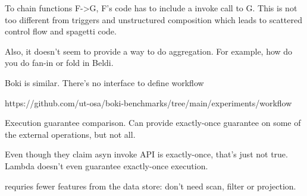 To chain functions F->G, F's code has to include a invoke call to G. This is
not too different from triggers and unstructured composition which leads to
scattered control flow and spagetti code.

Also, it doesn't seem to provide a way to do aggregation. For example, how do
you do fan-in or fold in Beldi.

Boki is similar. There's no interface to define workflow

https://github.com/ut-osa/boki-benchmarks/tree/main/experiments/workflow

Execution guarantee comparison. Can provide exactly-once guarantee on some of
the external operations, but not all.

Even though they claim asyn invoke API is exactly-once, that's just not true.
Lambda doesn't even guarantee exactly-once execution.

\name{} requries fewer features from the data store: don't need scan, filter
or projection.





 








